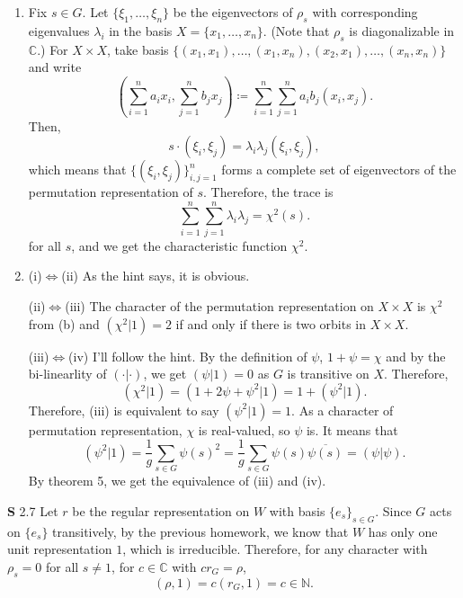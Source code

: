 \documentclass[a4paper, 12pt]{article}
\theoremstyle{Mydefinition}
\theoremstyle{Mytheorem}
\begin{document}
\begin{enumerate}
    \item Fix $s\in G$. Let $\{\xi_1, \ldots, \xi_n\}$ be the eigenvectors of $\rho_s$ with corresponding eigenvalues $\lambda_i$ in the basis $X = \{x_1, \ldots, x_n\}$. (Note that $\rho_s$ is diagonalizable in $\mathbb{C}$.) For $X\times X$, take basis $\{(x_1, x_1), \ldots, (x_1, x_n), (x_2, x_1), \ldots, (x_n, x_n)\}$ and write
    \begin{equation}
        \left(\sum_{i=1}^n a_i x_i, \sum_{j=1}^n b_j x_j\right) \coloneqq \sum_{i=1}^n\sum_{j=1}^na_ib_j\left(x_i, x_j\right).
    \end{equation}
    Then,
    \begin{equation}
        s\cdot (\xi_i, \xi_j) = \lambda_i\lambda_j(\xi_i, \xi_j),
    \end{equation}
    which means that $\{(\xi_i, \xi_j)\}_{i,j=1}^n$ forms a complete set of eigenvectors of the permutation representation of $s$. Therefore, the trace is
    \begin{equation}
        \sum_{i=1}^n\sum_{j=1}^n \lambda_i\lambda_j = \chi^2(s).
    \end{equation}
    for all $s$, and we get the characteristic function $\chi^2$.
    
    \item (i)$\Leftrightarrow$(ii) As the hint says, it is obvious.
    
    (ii)$\Leftrightarrow$(iii) The character of the permutation representation on $X\times X$ is $\chi^2$ from (b) and $(\chi^2|1) = 2$ if and only if there is two orbits in $X\times X$.
    
    (iii)$\Leftrightarrow$(iv) I'll follow the hint. By the definition of $\psi$, $1+\psi = \chi$ and by the bi-linearlity of $(\cdot| \cdot)$, we get $(\psi|1) = 0$ as $G$ is transitive on $X$. Therefore,
    \begin{equation}
        (\chi^2|1) =(1+2\psi+\psi^2|1) = 1+(\psi^2|1).
    \end{equation}
    Therefore, (iii) is equivalent to say $(\psi^2|1) = 1$. As a character of permutation representation, $\chi$ is real-valued, so $\psi$ is. It means that
    \begin{equation}
        (\psi^2|1) = \frac{1}{g}\sum_{s\in G}\psi(s)^2 = \frac{1}{g}\sum_{s\in G}\psi(s)\overline{\psi(s)} = (\psi|\psi).
    \end{equation}
    By theorem 5, we get the equivalence of (iii) and (iv).
\end{enumerate}

\noindent \textbf{S} 2.7
Let $r$ be the regular representation on $W$ with basis $\{e_s\}_{s\in G}$. Since $G$ acts on $\{e_s\}$ transitively, by the previous homework, we know that $W$ has only one unit representation $1$, which is irreducible. Therefore, for any character with $\rho_s = 0$ for all $s\neq 1$, for $c\in \mathbb{C}$ with $cr_G = \rho$,
\begin{equation}
    (\rho, 1) = c(r_G, 1) = c\in \mathbb{N}.
\end{equation}
\end{document}
